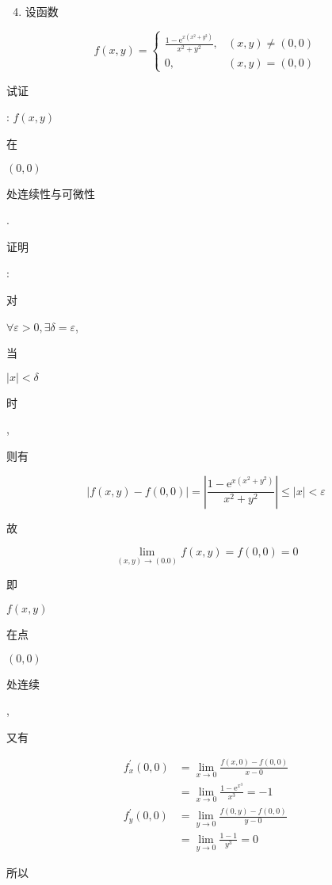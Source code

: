 \documentclass[10pt]{article}
\begin{document}
\begin{enumerate}
  \setcounter{enumi}{3}
  \item \begin{CJK}{UTF8}{mj}设函数\end{CJK}
\end{enumerate}
$$
f(x, y)=\left\{\begin{array}{cl}
\frac{1-\mathrm{e}^{x\left(x^{2}+y^{2}\right)}}{x^{2}+y^{2}}, & (x, y) \neq(0,0) \\
0, & (x, y)=(0,0)
\end{array}\right.
$$
\begin{CJK}{UTF8}{mj}试证\end{CJK}: $f(x, y)$ \begin{CJK}{UTF8}{mj}在\end{CJK} $(0,0)$ \begin{CJK}{UTF8}{mj}处连续性与可微性\end{CJK}.

\begin{CJK}{UTF8}{mj}证明\end{CJK}: \begin{CJK}{UTF8}{mj}对\end{CJK} $\forall \varepsilon>0, \exists \delta=\varepsilon$, \begin{CJK}{UTF8}{mj}当\end{CJK} $|x|<\delta$ \begin{CJK}{UTF8}{mj}时\end{CJK}, \begin{CJK}{UTF8}{mj}则有\end{CJK}
$$
|f(x, y)-f(0,0)|=\left|\frac{1-\mathrm{e}^{x\left(x^{2}+y^{2}\right)}}{x^{2}+y^{2}}\right| \leq|x|<\varepsilon
$$
\begin{CJK}{UTF8}{mj}故\end{CJK}
$$
\lim _{(x, y) \rightarrow(0.0)} f(x, y)=f(0,0)=0
$$
\begin{CJK}{UTF8}{mj}即\end{CJK} $f(x, y)$ \begin{CJK}{UTF8}{mj}在点\end{CJK} $(0,0)$ \begin{CJK}{UTF8}{mj}处连续\end{CJK}, \begin{CJK}{UTF8}{mj}又有\end{CJK}
$$
\begin{aligned}
f_{x}^{\prime}(0,0) &=\lim _{x \rightarrow 0} \frac{f(x, 0)-f(0,0)}{x-0} \\
&=\lim _{x \rightarrow 0} \frac{1-\mathrm{e}^{x^{3}}}{x^{3}}=-1 \\
f_{y}^{\prime}(0,0) &=\lim _{y \rightarrow 0} \frac{f(0, y)-f(0,0)}{y-0} \\
&=\lim _{y \rightarrow 0} \frac{1-1}{y^{3}}=0
\end{aligned}
$$
\begin{CJK}{UTF8}{mj}所以\end{CJK}
\end{document}
